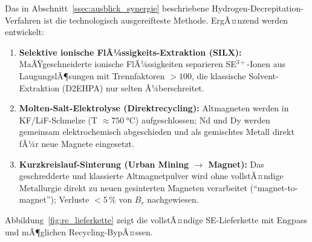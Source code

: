 ﻿\documentclass[12pt, a4paper]{report}
\theoremstyle{definition}
\theoremstyle{remark}
\begin{document}
Das in Abschnitt~\ref{ssec:ausblick_synergie} beschriebene
Hydrogen-Decrepitation-Verfahren ist die technologisch ausgereifteste
Methode. ErgÃ¤nzend werden entwickelt:
\begin{enumerate}[label=\arabic*.]
  \item \textbf{Selektive ionische FlÃ¼ssigkeits-Extraktion (SILX):} MaÃŸgeschneiderte
        ionische FlÃ¼ssigkeiten separieren SE$^{3+}$-Ionen aus LaugungslÃ¶sungen
        mit Trennfaktoren $>100$, die klassische Solvent-Extraktion (D2EHPA)
        nur selten Ã¼berschreitet.
  \item \textbf{Molten-Salt-Elektrolyse (Direktrecycling):} Altmagneten werden
        in KF/LiF-Schmelze (T $\approx\SI{750}{\celsius}$) aufgeschlossen;
        Nd und Dy werden gemeinsam elektrochemisch abgeschieden und als
        gemischtes Metall direkt fÃ¼r neue Magnete eingesetzt.
  \item \textbf{Kurzkreislauf-Sinterung (Urban Mining $\to$ Magnet):}
        Das geschredderte und klassierte Altmagnetpulver wird ohne
        vollstÃ¤ndige Metallurgie direkt zu neuen gesinterten Magneten
        verarbeitet (``magnet-to-magnet''); Verluste $< 5\,\%$ von
        $B_r$ nachgewiesen.
\end{enumerate}

Abbildung~\ref{fig:re_lieferkette} zeigt die vollstÃ¤ndige SE-Lieferkette
mit Engpass und mÃ¶glichen Recycling-BypÃ¤ssen.
\end{document}
